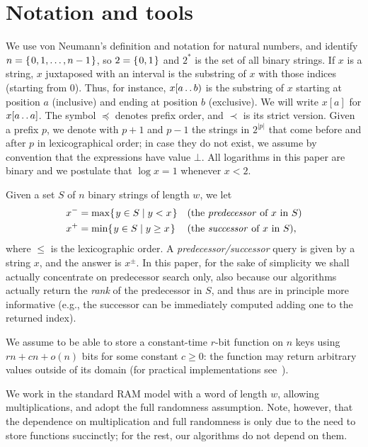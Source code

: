 \documentclass{article}
\newcommand{\?}{\mskip1.5mu}
\def\..{\,\mathpunct{\ldotp\ldotp}} %
\begin{document}
\section{Notation and tools}
\label{sec:notation}

We use von Neumann's definition
and notation for natural numbers, and identify $n=\{\?0, 1, \ldots, n-1\?\}$, so
$2=\{\?0,1\?\}$ and $2^*$ is the set of all binary strings.
If $x$ is a string, $x$ juxtaposed with an interval is the substring of $x$ with
those indices (starting from 0). Thus, for instance, $x[a\..b)$
is the substring of $x$ starting at position $a$ (inclusive) and ending at position
$b$ (exclusive). We will write $x[a]$ for $x[a\..a]$. The symbol $\preceq$
denotes prefix order, and $\prec$ is its strict version. Given a prefix $p$, we
denote with $p+1$ and $p-1$ the strings in $2^{|p|}$ that come before and after
$p$ in lexicographical order; in case they do not exist, we assume by convention
that the expressions have value $\bot$. 
All logarithms in this paper are binary and we postulate that $\log x=1$
whenever $x<2$.

Given a set $S$ of $n$ binary strings of length $w$, we let
\begin{align*}
	x^- &= \max\{\?y \in S \mid y< x\?\} &&\text{(the \emph{predecessor} of
	$x$ in $S$)}\\
	x^+ &= \min\{\?y \in S \mid y\geq x\?\} && \text{(the \emph{successor} of
	$x$ in $S$)},
\end{align*}
where $\leq$ is the lexicographic order. A \emph{predecessor/successor} query is
given by a string $x$, and the answer is $x^\pm$. In this paper, for the sake
of simplicity we shall actually concentrate on predecessor search only,
also because our algorithms actually return the \emph{rank} of the predecessor
in $S$, and thus are in principle more informative (e.g., the successor can be
immediately computed adding one to the returned index).

We assume to be able to store a constant-time $r$-bit function on $n$ keys using
$rn+cn +o(n)$ bits for some constant $c\geq 0$: the function may return
arbitrary values outside of its domain (for practical implementations
see~\cite{BBPTPMMPH}).

We work in the standard RAM model with a word of length $w$, allowing
multiplications, and adopt the full randomness assumption. Note, however, 
that the dependence on multiplication and full randomness is only due to the
need to store functions succinctly; for the rest, our algorithms do not depend
on them.
\end{document}
